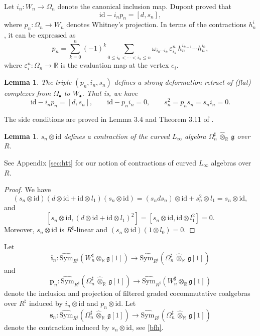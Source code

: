 \documentclass[12pt]{amsart}
\newtheorem{lem}[defn]{Lemma}
\numberwithin{equation}{section}
\theoremstyle{plain}
\newcommand{\bfi}{\mathbf{i}}
\newcommand{\bfp}{\mathbf{p}}
\newcommand{\bfs}{\mathbf{s}}
\newcommand{\fg}{\mathfrak{g}}
\newcommand{\R}{\mathbb{R}}
\newcommand{\Sym}{\mathrm{Sym}}
\newcommand{\id}{\mathrm{id}}
\newcommand{\wSym}{\widehat{\Sym}}
\newcommand{\wotimes}{\widehat{\otimes}}
\newcommand{\uR}{{R^\sharp}}
\begin{document}
	Let $i_n\colon W_n \rightarrow \Omega_n$ denote the canonical inclusion map. Dupont proved that
	\[
	\id - i_n p_n = [d, s_n],
	\]
	where $p_n \colon \Omega_n \to W_n$ denotes Whitney’s projection. In terms of the contractions $h_n^i$, it can be expressed as 
	\[
	p_n
	=
	\sum_{k=0}^n (-1)^k
	\sum_{0 \le i_0 < \cdots < i_k \le n}
	\omega_{i_0\cdots i_k}\,
	\varepsilon_{i_k}^n\,
	h^{i_{k-1}}_n \cdots h^{i_0}_n,
	\]
	where $\varepsilon^n_i\colon \Omega_n \rightarrow \R$ is the evaluation map at the vertex $e_i$. 
	
	\begin{lem}
		The triple $(p_n, i_n, s_n)$ defines a strong deformation retract of (flat) complexes from $\Omega_\bullet$ to $W_\bullet$. That is, we have
		\[
		\id - i_np_n = [d,s_n],
		\qquad
		\id - p_ni_n = 0,
		\qquad
		s_n^2 = p_ns_n = s_ni_n = 0.
		\]
	\end{lem}
	The side conditions are proved in Lemma 3.4 and Theorem 3.11 of \cite{getzler2009}.
	
	\begin{lem}
		$s_n \otimes \id$ defines a contraction of the curved $L_\infty$ algebra $\Omega_n^\sharp \,\wotimes_\R\, \fg$ over $R$.
	\end{lem}
	See Appendix \ref{sec:htt} for our notion of contractions of curved $L_\infty$ algebras over $R$.
	\begin{proof}
	    We have 
	    \[
	    (s_n \otimes \id) (d \otimes \id + \id \otimes l_1) (s_n \otimes \id) = (s_n d s_n) \otimes \id + s_n^2 \otimes l_1 = s_n \otimes \id, 
	    \]
	    and
	    \[
	    [s_n \otimes \id, (d \otimes \id + \id \otimes l_1)^2]= [s_n \otimes \id, \id \otimes l_1^2] = 0.
	    \]
	    Moreover, $s_n \otimes \id$ is $\uR$-linear and $(s_n \otimes \id)(1 \otimes l_0) = 0$.
	\end{proof}
	
	Let 
	\[
	\bfi_n\colon \wSym_\uR(W_n^\sharp \otimes_\R \fg[1]) \longrightarrow \wSym_\uR(\Omega_n^\sharp \,\wotimes_\R\, \fg[1]) 
	\]
	and
	\[
	\bfp_n\colon \wSym_\uR(\Omega_n^\sharp \,\wotimes_\R\, \fg[1]) \longrightarrow \wSym_\uR(W_n^\sharp \otimes_\R \fg[1]) 
	\]
	denote the inclusion and projection of filtered graded cocommutative coalgebras over $\uR$ induced by $i_n \otimes \id$ and $p_n \otimes \id$. Let 
	\[
	\bfs_n\colon  \wSym_\uR(\Omega_n^\sharp \,\wotimes_\R\, \fg[1])  \longrightarrow \wSym_\uR(\Omega_n^\sharp \,\wotimes_\R\, \fg[1]) 
	\]
	denote the contraction induced by $s_n \otimes \id$, see \eqref{bfh}.
	
\end{document}
